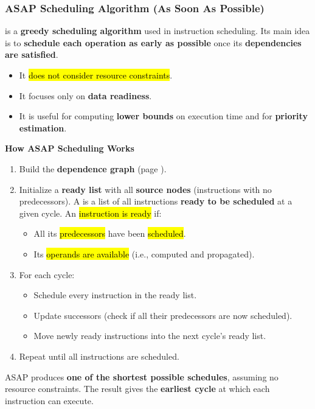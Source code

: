 \subsubsection{ASAP Scheduling Algorithm (As Soon As Possible)}

 is a \textbf{greedy scheduling algorithm} used in instruction scheduling. Its main idea is to \textbf{schedule each operation as early as possible} once its \textbf{dependencies are satisfied}.
\begin{itemize}
    \item It \hl{does not consider resource constraints}.
    \item It focuses only on \textbf{data readiness}.
    \item It is useful for computing \textbf{lower bounds} on execution time and for \textbf{priority estimation}.
\end{itemize}

\begin{flushleft}
    \textcolor{Green3}{ \textbf{How ASAP Scheduling Works}}
\end{flushleft}
\begin{enumerate}
    \item Build the \textbf{dependence graph} (page \pageref{subsubsection: Dependence Graph and Critical Path}).
    \item Initialize a \textbf{ready list} with all \textbf{source nodes} (instructions with no predecessors). A  is a list of all instructions \textbf{ready to be scheduled} at a given cycle. An \hl{instruction is ready} if:
    \begin{itemize}
        \item All its \hl{predecessors} have been \hl{scheduled}.
        \item Its \hl{operands are available} (i.e., computed and propagated).
    \end{itemize}
    \item For each cycle:
    \begin{itemize}
        \item Schedule every instruction in the ready list.
        \item Update successors (check if all their predecessors are now scheduled).
        \item Move newly ready instructions into the next cycle's ready list.
    \end{itemize}
    \item Repeat until all instructions are scheduled.
\end{enumerate}
ASAP produces \textbf{one of the shortest possible schedules}, assuming no resource constraints. The result gives the \textbf{earliest cycle} at which each instruction can execute.

